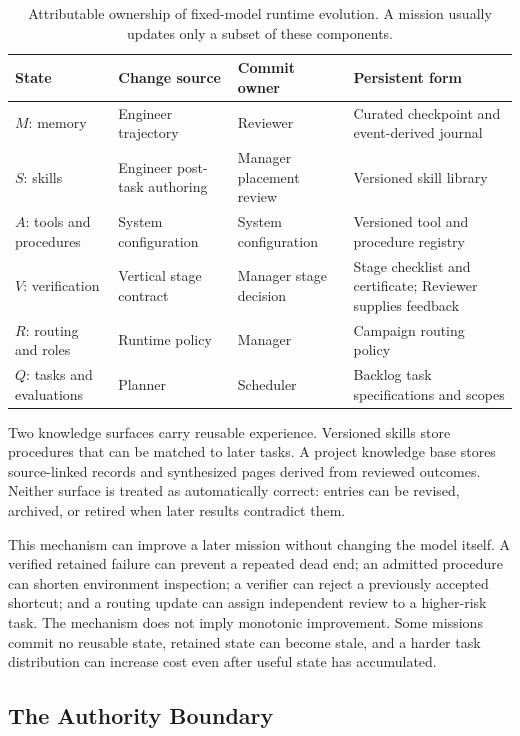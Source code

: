 \begin{table}[H]
\centering
\small
\begin{tabularx}{\linewidth}{@{}p{2.25cm} p{2.75cm} p{2.55cm} X@{}}
\toprule
\rowcolor{papersand}
\textbf{State} & \textbf{Change source} & \textbf{Commit owner} & \textbf{Persistent form} \\
\midrule
$M$: memory & Engineer trajectory & Reviewer & Curated checkpoint and event-derived journal \\
$S$: skills & Engineer post-task authoring & Manager placement review & Versioned skill library \\
$A$: tools and procedures & System configuration & System configuration & Versioned tool and procedure registry \\
$V$: verification & Vertical stage contract & Manager stage decision & Stage checklist and certificate; Reviewer supplies feedback \\
$R$: routing and roles & Runtime policy & Manager & Campaign routing policy \\
$Q$: tasks and evaluations & Planner & Scheduler & Backlog task specifications and scopes \\
\bottomrule
\end{tabularx}
\caption{Attributable ownership of fixed-model runtime evolution. A mission usually
updates only a subset of these components.}
\label{tab:runtime-ownership}
\end{table}

Two knowledge surfaces carry reusable experience. Versioned skills store procedures
that can be matched to later tasks. A project knowledge base stores source-linked
records and synthesized pages derived from reviewed outcomes. Neither surface is
treated as automatically correct: entries can be revised, archived, or retired when
later results contradict them.

This mechanism can improve a later mission without changing the model itself. A
verified retained failure can prevent a repeated dead end; an admitted procedure can shorten
environment inspection; a verifier can reject a previously accepted shortcut; and
a routing update can assign independent review to a higher-risk task. The mechanism
does not imply monotonic improvement. Some missions commit no reusable state,
retained state can become stale, and a harder task distribution can increase cost
even after useful state has accumulated.

\subsection{The Authority Boundary}


